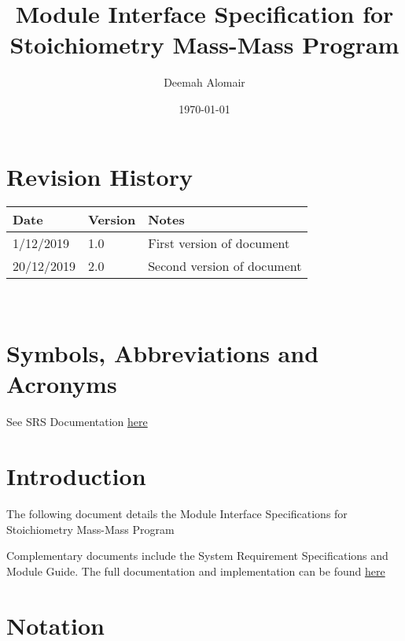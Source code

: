 \documentclass[12pt, titlepage]{article}
\begin{document}
\title{Module Interface Specification for Stoichiometry Mass-Mass Program}

\author{Deemah Alomair}

\date{\today}

\maketitle


\section{Revision History}

\begin{tabularx}{\textwidth}{p{3cm}p{2cm}X}
\toprule {\bf Date} & {\bf Version} & {\bf Notes}\\
\midrule
1/12/2019 & 1.0 & First version of document\\
20/12/2019 & 2.0 & Second version of document\\
\bottomrule
\end{tabularx}

~\newpage

\section{Symbols, Abbreviations and Acronyms}

See SRS Documentation  \href{https://github.com/deemaalomair1/CAS741_project/tree/master/docs/SRS}{here}


\newpage

\tableofcontents

\newpage


\section{Introduction}

The following document details the Module Interface Specifications for
Stoichiometry Mass-Mass Program

Complementary documents include the System Requirement Specifications
and Module Guide.  The full documentation and implementation can be
found \href{https://github.com/deemaalomair1/CAS741_project/tree/master/docs}{here}

\section{Notation}
\end{document}
